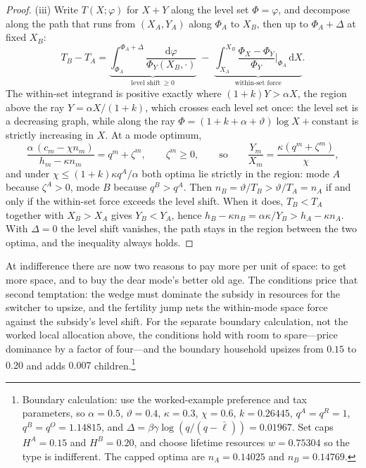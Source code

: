 \documentclass[11pt]{article}
\newcommand{\dd}{\mathrm d}
\newcommand{\1}{\mathbf 1}
\begin{document}
\begin{proof}
(iii) Write $T(X;\varphi)$ for $X+Y$ along the level set $\Phi=\varphi$, and decompose along the path that runs from $(X_A,Y_A)$ along $\Phi_A$ to $X_B$, then up to $\Phi_A+\Delta$ at fixed $X_B$:
\[
T_B-T_A
=
\underbrace{\int_{\Phi_A}^{\Phi_A+\Delta}\frac{\dd\varphi}{\Phi_Y(X_B,\cdot)}}_{\text{level shift}\ \ge0}
\;-\;
\underbrace{\int_{X_A}^{X_B}\frac{\Phi_X-\Phi_Y}{\Phi_Y}\bigg|_{\Phi_A}\,\dd X}_{\text{within-set force}}.
\]
The within-set integrand is positive exactly where $(1+k)Y>\alpha X$, the region above the ray $Y=\alpha X/(1+k)$, which crosses each level set once: the level set is a decreasing graph, while along the ray $\Phi=(1+k+\alpha+\vartheta)\log X+\text{constant}$ is strictly increasing in $X$. At a mode optimum,
\[
\frac{\alpha\,(c_m-\chi n_m)}{h_m-\kappa n_m}=q^m+\zeta^m,
\qquad
\zeta^m\ge0,
\qquad\text{so}\qquad
\frac{Y_m}{X_m}
=
\frac{\kappa(q^m+\zeta^m)}{\chi},
\]
and under $\chi\le(1+k)\kappa q^A/\alpha$ both optima lie strictly in the region: mode $A$ because $\zeta^A>0$, mode $B$ because $q^B>q^A$. Then $n_B=\vartheta/T_B>\vartheta/T_A=n_A$ if and only if the within-set force exceeds the level shift. When it does, $T_B<T_A$ together with $X_B>X_A$ gives $Y_B<Y_A$, hence $h_B-\kappa n_B=\alpha\kappa/Y_B>h_A-\kappa n_A$. With $\Delta=0$ the level shift vanishes, the path stays in the region between the two optima, and the inequality always holds.
\end{proof}

At indifference there are now two reasons to pay more per unit of space: to get more space, and to buy the dear mode's better old age. The conditions price that second temptation: the wedge must dominate the subsidy in resources for the switcher to upsize, and the fertility jump nets the within-mode space force against the subsidy's level shift. For the separate boundary calculation, not the worked local allocation above, the conditions hold with room to spare---price dominance by a factor of four---and the boundary household upsizes from $0.15$ to $0.20$ and adds $0.007$ children.\footnote{Boundary calculation: use the worked-example preference and tax parameters, so $\alpha=0.5$, $\vartheta=0.4$, $\kappa=0.3$, $\chi=0.6$, $k=0.26445$, $q^A=q^R=1$, $q^B=q^O=1.14815$, and $\Delta=\beta\gamma\log(q/(q-\bar\ell))=0.01967$. Set caps $H^A=0.15$ and $H^B=0.20$, and choose lifetime resources $w=0.75304$ so the type is indifferent. The capped optima are $n_A=0.14025$ and $n_B=0.14769$.}
\end{document}

